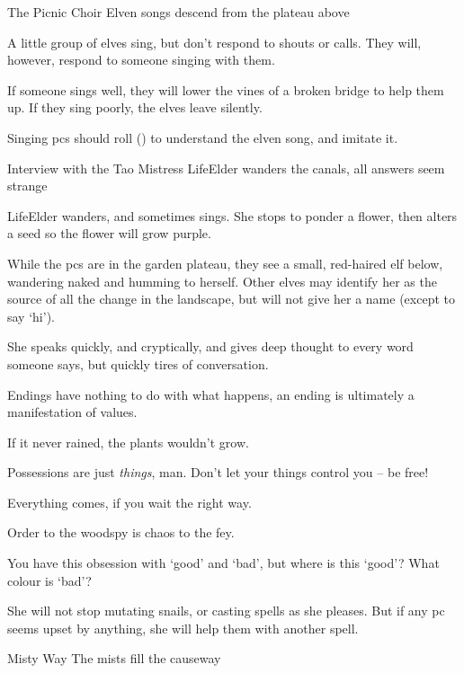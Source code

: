 
{The Picnic Choir}%
{Elven songs descend from the plateau above}%

A little group of elves sing, but don't respond to shouts or calls.
They will, however, respond to someone singing with them.

If someone sings well, they will lower the vines of a broken bridge to help them up.
If they sing poorly, the elves leave silently.

Singing \glspl{pc} should roll  (\tn[10]) to understand the elven song, and imitate it.

{Interview with the Tao Mistress}%
{LifeElder wanders the canals, all answers seem strange}%

\Gls{LifeElder} wanders, and sometimes sings.
She stops to ponder a flower, then alters a seed so the flower will grow purple.

While the \glspl{pc} are in the garden plateau, they see a small, red-haired elf below, wandering naked and humming to herself.
Other elves may identify her as the source of all the change in the landscape, but will not give her a name (except to say `hi').

She speaks quickly, and cryptically, and gives deep thought to every word someone says, but quickly tires of conversation.

\begin{speechtext}
  Endings have nothing to do with what happens, an ending is ultimately a manifestation of values.

  If it never rained, the plants wouldn't grow.

  Possessions are just \emph{things}, man.
  Don't let your things control you -- be free!

  Everything comes, if you wait the right way.

  Order to the \gls{woodspy} is chaos to the fey.

  You have this obsession with `good' and `bad', but where is this `good'?
  What colour is `bad'?

\end{speechtext}

She will not stop mutating snails, or casting spells as she pleases.
But if any \gls{pc} seems upset by anything, she will help them with another spell.

{Misty Way}%
{The mists fill the causeway}%

